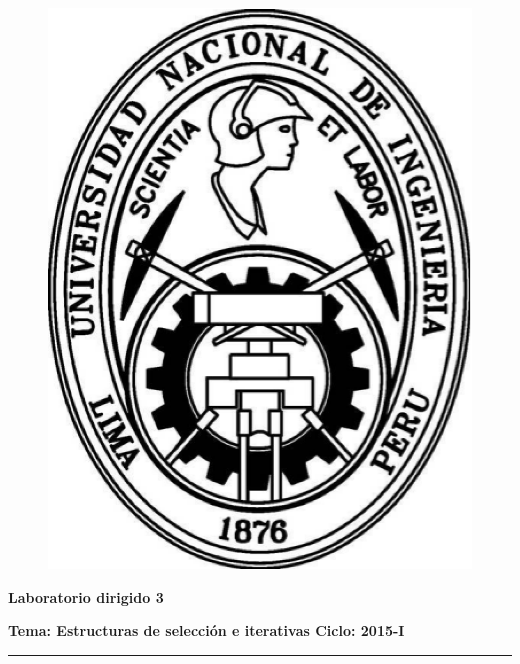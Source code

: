\documentclass[11pt,a4paper]{article}
\begin{document}
\begin{center}
\begin{figure}[ht!]
\begin{minipage}[c]{0.2\linewidth}
\includegraphics[scale=0.25]{EscudoUNI.eps}
\end{minipage}
\hfill{}
\begin{minipage}{0,8\columnwidth}
\centering{}
\end{minipage}
\end{figure}
\end{center}
\vspace*{-0.50cm}
\noindent

\begin{center}
\textbf{\Large Laboratorio dirigido 3}
\end{center}
\textbf{Tema: Estructuras de selecci\'on e iterativas \hfill Ciclo: 2015-I}
\noindent
\rule{\textwidth}{2pt}
\newline
\end{document}
